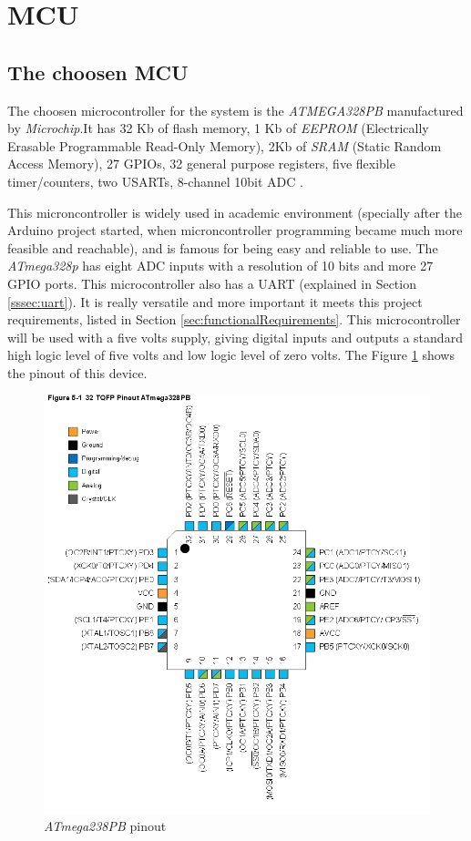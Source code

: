 \section{MCU}\label{sec:mcu-hw}

		\subsection{The choosen MCU}\label{ssec:the-choosen-mcu}

		The choosen microcontroller for the system is the \textit{ATMEGA328PB} manufactured by \textit{Microchip}.It has 32 Kb of flash memory, 1 Kb of \textit{EEPROM} (Electrically Erasable Programmable Read-Only Memory), 2Kb of \textit{SRAM} (Static Random Access Memory), 27 GPIOs, 32 general purpose registers, five flexible timer/counters, two USARTs, 8-channel 10bit ADC \cite{atmega328p-datasheet}. 
		\par
		This microncontroller is widely used in academic environment (specially after the Arduino project started, when microncontroller programming became much more feasible and reachable), and is famous for being easy and reliable to use. The \textit{ATmega328p} has eight ADC inputs with a resolution of 10 bits and more 27 GPIO ports. This microcontroller also has a UART (explained in Section \ref{sssec:uart}). It is really versatile and more important it meets this project requirements, listed in Section \ref{sec:functionalRequirements}. This microcontroller will be used with a five volts supply, giving digital inputs and outputs a standard high logic level of five volts and low logic level of zero volts. The Figure \ref{fig:atmega328pb} shows the pinout of this device.

		\begin{figure}[htbp]
			\centering
			\includegraphics[scale=0.5]{figuras/fig-atmega328pb.png}
			\caption{\textit{ATmega238PB} pinout \cite{atmega328p-datasheet}}
			\label{fig:atmega328pb}
		\end{figure}
		

